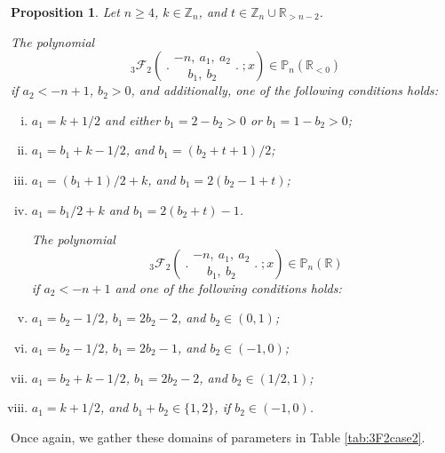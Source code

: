 \documentclass[reqno,11pt]{amsart}
\newtheorem{proposition}[theorem]{Proposition}
\theoremstyle{remark}
\renewcommand{\P}{\mathbb{P}}
\newcommand{\R}{\mathbb{R}}
\newcommand{\Z}{\mathbb{Z}}
\newcommand{\rr}{\mathbb{R}}
\newcommand*\pFq[5]{%
 {\ }_{#1}{\mathcal F}_{#2}{\left(\genfrac..{0pt}{}{#3}{#4};#5\right)}%
}
\begin{document}
\begin{proposition}
\label{prop:zeros3F2Case2Bis}
Let $n\ge 4$, $k \in \Z_n$, and $t\in \Z_n \cup\rr_{>n-2}$.

The polynomial
\begin{equation*}
    \pFq{3}{2}{-n,\ a_1, \ a_2 }{b_1,\ b_2}{x} \in \P_n(\R_{<0})
\end{equation*}
if $a_2<-n+1$, $b_2>0$, and additionally, one of the following conditions holds:
\begin{enumerate}[(i)]
  \item  
   $ a_1=  k + 1/2$ and
   either $b_1=2-b_2>0$ or $b_1=1-b_2>0$;

 \item   \label{iiOfPropzeros3F2Case2Bis}
    $ a_1= b_1 + k -1/2$, and 
$b_1 = (b_2+t+1)/2$;

 \item  
   $ a_1= (b_1+1)/2+k  $, and $b_1 =2(b_2-1+t)$;

\item  
   $ a_1= b_1 /2+k$ and $b_1 =2(b_2+t)-1$.

\vspace{.2cm}

\hspace{-1.3cm} The polynomial  
\begin{equation*}
    \pFq{3}{2}{-n,\ a_1, \ a_2}{b_1,\ b_2}{x} \in \P_n(\R)
\end{equation*}
if $a_2<-n+1$ and one of the following conditions holds:

\vspace{.2cm}

    \item   
    $ a_1= b_2  -1/2 $,   
$b_1 = 2b_2 -2$, and $b_2\in (0,1)$;

   \item  \label{viOfPropzeros3F2Case2Bis}
   $ a_1=  b_2-1/2$, $b_1=2b_2-1$, and $b_2\in (-1,0)$;
   
  \item  
    $ a_1= b_2 + k -1/2 $,  
$b_1 = 2b_2 -2$, and $b_2\in (1/2,1)$;

 \item  
   $ a_1=  k +1/2  $, and   $b_1  + b_2\in \{1,2\}$, if   $b_2\in (-1,0) $.
\end{enumerate}    
\end{proposition}

Once again, we gather these domains of parameters in Table \ref{tab:3F2case2}. 
 
\end{document}
